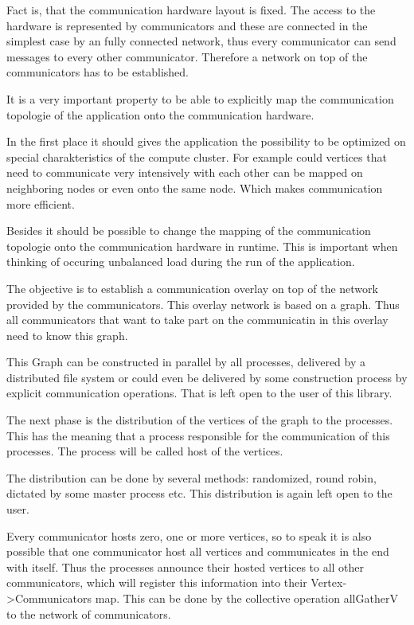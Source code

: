 Fact is, that the communication hardware layout is fixed. The access
to the hardware is represented by communicators and these are
connected in the simplest case by an fully connected network, thus
every communicator can send messages to every other
communicator. Therefore a network on top of the communicators has to
be established.

It is a very important property to be able to explicitly map the
communication topologie of the application onto the communication
hardware.

In the first place it should gives the application the possibility to
be optimized on special charakteristics of the compute cluster. For
example could vertices that need to communicate very intensively with
each other can be mapped on neighboring nodes or even onto the same
node. Which makes communication more efficient.

Besides it should be possible to change the mapping of the
communication topologie onto the communication hardware in
runtime. This is important when thinking of occuring unbalanced load
during the run of the application.

The objective is to establish a communication overlay on top of the
network provided by the communicators. This overlay network is based
on a graph. Thus all communicators that want to take part on the
communicatin in this overlay need to know this graph.

This Graph can be constructed in parallel by all processes, delivered
by a distributed file system or could even be delivered by some
construction process by explicit communication operations. That is
left open to the user of this library.

The next phase is the distribution of the vertices of the graph to the
processes. This has the meaning that a process responsible for the
communication of this processes. The process will be called host of
the vertices.

The distribution can be done by several methods: randomized, round
robin, dictated by some master process etc. This distribution is again
left open to the user.

Every communicator hosts zero, one or more vertices, so to speak it is
also possible that one communicator host all vertices and communicates
in the end with itself.  Thus the processes announce their hosted
vertices to all other communicators, which will register this
information into their Vertex->Communicators map.  This can be done by
the collective operation allGatherV to the network of communicators.


